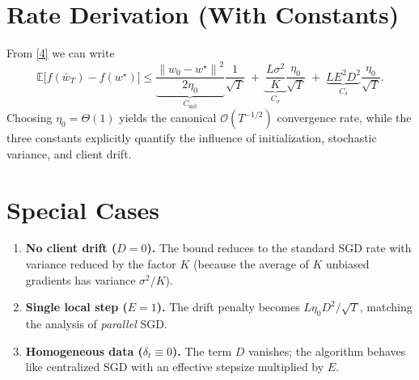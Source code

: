 \documentclass{article}
\newcommand{\E}{\mathbb{E}}
\newcommand{\norm}[1]{\left\lVert #1 \right\rVert}
\begin{document}
\section*{Rate Derivation (With Constants)}
From \eqref{4} we can write
\[
\E\!\bigl[f(\bar w_T)-f(w^\star)\bigr]
\le
\underbrace{\frac{\norm{w_0-w^\star}^2}{2\eta_0}}_{\displaystyle C_{\text{init}}}
\frac{1}{\sqrt{T}}
\;+\;
\underbrace{\frac{L\sigma^2}{K}}_{\displaystyle C_{\sigma}}
\frac{\eta_0}{\sqrt{T}}
\;+\;
\underbrace{L E^2 D^2}_{\displaystyle C_{\delta}}
\frac{\eta_0}{\sqrt{T}} .
\]
Choosing $\eta_0=\Theta(1)$ yields the canonical $\mathcal O(T^{-1/2})$ convergence rate, while the three constants explicitly quantify the influence of initialization, stochastic variance, and client drift.

\section*{Special Cases}
\begin{enumerate}[label=\alph*.]
\item \textbf{No client drift ($D=0$).} The bound reduces to the standard SGD rate with variance reduced by the factor $K$ (because the average of $K$ unbiased gradients has variance $\sigma^2/K$).
\item \textbf{Single local step ($E=1$).} The drift penalty becomes $L\eta_0 D^2/\sqrt{T}$, matching the analysis of \emph{parallel} SGD.
\item \textbf{Homogeneous data ($\delta_t\equiv0$).} The term $D$ vanishes; the algorithm behaves like centralized SGD with an effective stepsize multiplied by $E$.
\end{enumerate}
\end{document}
